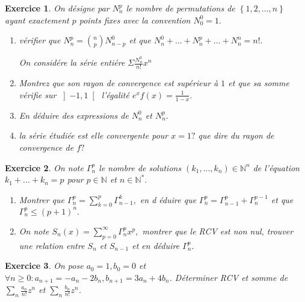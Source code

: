\documentclass[17pt,a4paper,landscape]{article}
\theoremstyle{break}
\theoremstyle{break}
\newtheorem{Exo}{Exercice}
\begin{document}
 \begin{Exo}
 	On désigne par $N_{n}^{p}$ le nombre de permutations de $\left\{
1,2,...,n\right\} $ ayant exactement $p$ points fixes avec la convention $%
N_{0}^{0}=1.$

\begin{enumerate}
	\item vérifier que $N_{n}^{p}=\binom{n}{p}N_{n-p}^{0}$ et que $%
	N_{n}^{0}+...+N_{n}^{p}+...+N_{n}^{n}=n!.$
	
	On considére la série entiére $\Sigma \frac{N_{n}^{0}}{n!}x^{n}$
	
	\item Montrez que son rayon de convergence est supérieur \`{a} $1$ et
	que sa somme vérifie sur $\left] -1,1\right[ $ l'égalité $%
	e^{x}f(x)=\frac{1}{1-x}.$
	
	\item En déduire des expressions de $N_{n}^{0}$ et $N_{n}^{p}.$
	
	\item la série étudiée est elle convergente pour $x=1?$ que dire
	du rayon de convergence de $f?$
\end{enumerate}
 \end{Exo}

\begin{Exo}
	 On note $\Gamma _{n}^{p}$ le nombre de solutions $\left(
k_{1},...,k_{n}\right) \in \mathbb{N}^{n}$ de l'équation $%
k_{1}+...+k_{n}=p$ pour $p\in \mathbb{N}$ et $n\in \mathbb{N}^{*}.$

\begin{enumerate}
	\item Montrer que $\Gamma _{n}^{p}=\sum_{k=0}^{p}\Gamma _{n-1}^{k},$ en d%
	éduire que $\Gamma _{n}^{p}=\Gamma _{n-1}^{p}+\Gamma _{n}^{p-1}$ et que $%
	\Gamma _{n}^{p}\leq \left( p+1\right) ^{n}.$
	
	\item On note $S_{n}\left( x\right) =\sum_{p=0}^{\infty }\Gamma
	_{n}^{p}x^{p},$ montrer que le RCV est non nul, trouver une relation entre $%
	S_{n}$ et $S_{n-1}$ et en déduire $\Gamma _{n}^{p}.$
\end{enumerate}
\end{Exo}


\begin{Exo}
	 On pose $a_0=1,b_0=0$ et $\forall n\geqslant 0:a_{n+1}=-a_n-2b_n,b_{n+1}=3a_n+4b_n$. Déterminer RCV et somme de $\sum_n\frac{a_n}{n!}z^n$ et $\sum_n \frac{b_n}{n!}z^n$.	

\end{Exo}	
\end{document}
